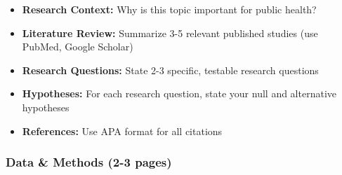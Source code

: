 \documentclass[11pt]{article}
\begin{document}
\begin{itemize}
\item \textbf{Research Context:} Why is this topic important for public health?
\item \textbf{Literature Review:} Summarize 3-5 relevant published studies (use PubMed, Google Scholar)
\item \textbf{Research Questions:} State 2-3 specific, testable research questions
\item \textbf{Hypotheses:} For each research question, state your null and alternative hypotheses
\item \textbf{References:} Use APA format for all citations
\end{itemize}

\subsubsection{Data \& Methods (2-3 pages)}
\end{document}
